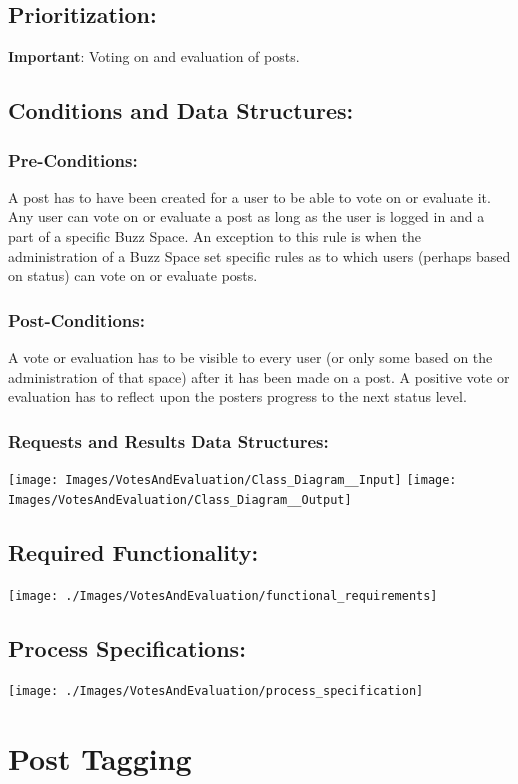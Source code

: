 \documentclass[a4paper,11pt]{article}
\begin{document}
\subsection{Prioritization:} 
\textbf{Important}: Voting on and evaluation of posts.
\subsection{Conditions and Data Structures:}
\subsubsection*{Pre-Conditions:}
A post has to have been created for a user to be able to vote on or evaluate it. Any user can vote on or evaluate a post as long as the user is logged in and a part of a specific Buzz Space. An exception to this rule is when the administration of a Buzz Space set specific rules as to which users (perhaps based on status) can vote on or evaluate posts.
\subsubsection*{Post-Conditions:}
A vote or evaluation has to be visible to every user (or only some based on the administration of that space) after it has been made on a post. A positive vote or evaluation has to reflect upon the posters progress to the next status level.
\subsubsection*{Requests and Results Data Structures:}
\texttt{[image: Images/VotesAndEvaluation/Class\_Diagram\_\_Input]}
\texttt{[image: Images/VotesAndEvaluation/Class\_Diagram\_\_Output]}
\subsection{Required Functionality:} 
\begin{center}
\texttt{[image: ./Images/VotesAndEvaluation/functional\_requirements]}
\end{center}
\subsection{Process Specifications:} 
\begin{center}
\texttt{[image: ./Images/VotesAndEvaluation/process\_specification]}
\end{center}

\section{Post Tagging}
\end{document}
